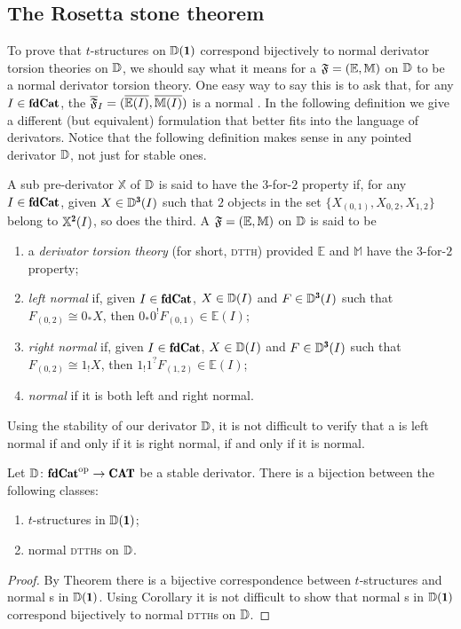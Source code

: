 \subsection{The Rosetta stone theorem}\label{higher_rosetta_subs}
To prove that $t$-structures on $\D(\uno)$ correspond bijectively to normal derivator torsion theories on $\mathbb{D}$,  we should say what it means for a \dfs $\mathfrak{F}=(\mathbb E,\mathbb M)$ on $\mathbb{D}$ to be a normal derivator torsion theory. One easy way to say this is to ask that, for any $I\in \fincat$, the {\hfs} $\overline{\mathfrak{F}}_I=(\overline{\mathbb E(I)},\overline{\mathbb M(I)})$ is a normal \htth. In the following definition we give a different (but equivalent) formulation that better fits into the language of derivators. Notice that the following definition makes sense in any pointed derivator $\mathbb{D}$, not just for stable ones.

\begin{definition}
A sub pre-derivator $\mathbb X$ of $\mathbb{D}$ is said to have the $3$-for-$2$ property if, for any $I\in \fincat$, given $X\in \D^\tre(I)$ such that $2$ objects in the set $\{X_{(0,1)},X_{0,2},X_{1,2}\}$ belong to $\mathbb X^{\due}(I)$, so does the third. A \dfs $\mathfrak{F}=(\mathbb E,\mathbb M)$ on $\mathbb{D}$ is said to be
\begin{enumerate}
\item a \emph{derivator torsion theory} (for short, \textsc{dtth}) provided $\mathbb E$ and $\mathbb M$ have the $3$-for-$2$ property;
\item \emph{left normal} if, given $I\in \fincat$, $X\in \mathbb{D}(I)$ and $F\in \D^\tre({I})$ such that $F_{(0,2)}\cong 0_*X$, then $0_*0^!F_{(0,1)}\in \mathbb E(I)$;
\item \emph{right normal} if, given $I\in \fincat$, $X\in \mathbb{D}(I)$ and $F\in \D^\tre({I})$ such that $F_{(0,2)}\cong 1_!X$, then $1_!1^?F_{(1,2)}\in \mathbb E(I)$;
\item \emph{normal} if it is both left and right normal.
\end{enumerate}
\end{definition}

Using the stability of our derivator $\mathbb{D}$, it is not difficult to verify that a \dfs is left normal if and only if it is right normal, if and only if it is normal.

\begin{theorem}
Let $\D\colon \fincat^\opp\to \Cat$ be a stable derivator. There is a bijection between the following classes:
\begin{enumerate}
\item $t$-structures in $\D(\uno)$; 
\item normal \textsc{dtth}s on $\mathbb{D}$.
\end{enumerate}
\end{theorem}
\begin{proof}
By Theorem  there is a bijective correspondence between $t$-structures and normal {\htth}s in $\D(\uno)$. Using Corollary  it is not difficult to show that normal {\htth}s in $\D(\uno)$ correspond bijectively to normal \textsc{dtth}s on $\mathbb{D}$.
\end{proof}

